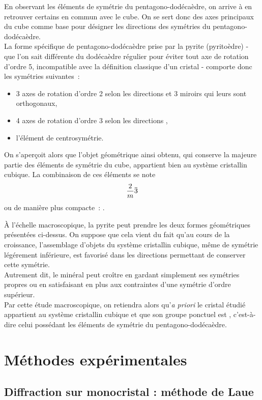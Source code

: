 En observant les éléments de symétrie du pentagono-dodécaèdre, on arrive à en retrouver certains en commun avec le cube. On se sert donc des axes principaux du cube comme base pour désigner les directions des symétries du pentagono-dodécaèdre.\\
La forme spécifique de pentagono-dodécaèdre prise par la pyrite (pyritoèdre) - que l'on sait différente du dodécaèdre régulier pour éviter tout axe de rotation d'ordre 5, incompatible avec la définition classique d'un cristal - comporte donc les symétries suivantes~:
\begin{itemize}
    \item 3 axes de rotation d'ordre 2 selon les directions  et 3 miroirs qui leurs sont orthogonaux,
    \item 4 axes de rotation d'ordre 3 selon les directions ,
    \item l'élément de centrosymétrie.
\end{itemize}
On s'aperçoit alors que l'objet géométrique ainsi obtenu, qui conserve la majeure partie des éléments de symétrie du cube, appartient bien au système cristallin cubique.
La combinaison de ces éléments se note 
\[
\hmn{*2 -3}
\]
ou de manière plus compacte~: .

À l'échelle macroscopique, la pyrite peut prendre les deux formes géométriques présentées ci-dessus. On suppose que cela vient du fait qu'au cours de la croissance, l'assemblage d'objets du système cristallin cubique, même de symétrie légérement inférieure, est favorisé dans les directions permettant de conserver cette symétrie.\\
Autrement dit, le minéral peut croître en gardant simplement ses symétries propres ou en satisfaisant en plus aux contraintes d'une symétrie d'ordre supérieur.\\
Par cette étude macroscopique, on retiendra alors qu'\textit{a priori} le cristal étudié appartient au système cristallin cubique et que son groupe ponctuel est , c'est-à-dire celui possédant les éléments de symétrie du pentagono-dodécaèdre.

\section{Méthodes expérimentales}

\subsection{Diffraction sur monocristal : méthode de Laue}

